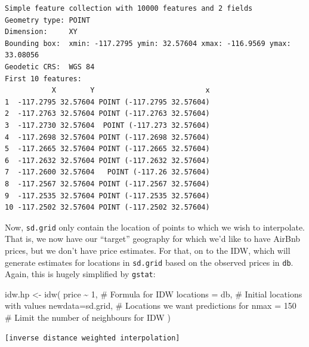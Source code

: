 \documentclass[
  letterpaper,
  DIV=11,
  numbers=noendperiod,
  oneside]{scrreprt}
\newenvironment{Shaded}{\begin{snugshade}}{\end{snugshade}}
\newcommand{\AttributeTok}[1]{\textcolor[rgb]{0.40,0.45,0.13}{#1}}
\newcommand{\CommentTok}[1]{\textcolor[rgb]{0.37,0.37,0.37}{#1}}
\newcommand{\DecValTok}[1]{\textcolor[rgb]{0.68,0.00,0.00}{#1}}
\newcommand{\FunctionTok}[1]{\textcolor[rgb]{0.28,0.35,0.67}{#1}}
\newcommand{\NormalTok}[1]{\textcolor[rgb]{0.00,0.23,0.31}{#1}}
\newcommand{\OtherTok}[1]{\textcolor[rgb]{0.00,0.23,0.31}{#1}}
\newcommand{\SpecialCharTok}[1]{\textcolor[rgb]{0.37,0.37,0.37}{#1}}
\begin{document}
\begin{verbatim}
Simple feature collection with 10000 features and 2 fields
Geometry type: POINT
Dimension:     XY
Bounding box:  xmin: -117.2795 ymin: 32.57604 xmax: -116.9569 ymax: 33.08056
Geodetic CRS:  WGS 84
First 10 features:
           X        Y                          x
1  -117.2795 32.57604 POINT (-117.2795 32.57604)
2  -117.2763 32.57604 POINT (-117.2763 32.57604)
3  -117.2730 32.57604  POINT (-117.273 32.57604)
4  -117.2698 32.57604 POINT (-117.2698 32.57604)
5  -117.2665 32.57604 POINT (-117.2665 32.57604)
6  -117.2632 32.57604 POINT (-117.2632 32.57604)
7  -117.2600 32.57604   POINT (-117.26 32.57604)
8  -117.2567 32.57604 POINT (-117.2567 32.57604)
9  -117.2535 32.57604 POINT (-117.2535 32.57604)
10 -117.2502 32.57604 POINT (-117.2502 32.57604)
\end{verbatim}

Now, \texttt{sd.grid} only contain the location of points to which we
wish to interpolate. That is, we now have our ``target'' geography for
which we'd like to have AirBnb prices, but we don't have price
estimates. For that, on to the IDW, which will generate estimates for
locations in \texttt{sd.grid} based on the observed prices in
\texttt{db}. Again, this is hugely simplified by \texttt{gstat}:

\begin{Shaded}
\begin{Highlighting}[]
\NormalTok{idw.hp }\OtherTok{\textless{}{-}} \FunctionTok{idw}\NormalTok{(}
\NormalTok{  price }\SpecialCharTok{\textasciitilde{}} \DecValTok{1}\NormalTok{,         }\CommentTok{\# Formula for IDW}
  \AttributeTok{locations =}\NormalTok{ db,    }\CommentTok{\# Initial locations with values}
  \AttributeTok{newdata=}\NormalTok{sd.grid,   }\CommentTok{\# Locations we want predictions for}
  \AttributeTok{nmax =} \DecValTok{150}         \CommentTok{\# Limit the number of neighbours for IDW}
\NormalTok{)}
\end{Highlighting}
\end{Shaded}

\begin{verbatim}
[inverse distance weighted interpolation]
\end{verbatim}
\end{document}

